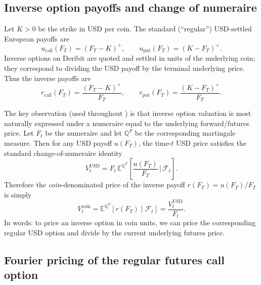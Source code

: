 \documentclass[a4paper,titlepage,12pt]{report}
\theoremstyle{plain}
\begin{document}
\subsection{Inverse option payoffs and change of numeraire}
\label{subsec:inverse_payoffs}

Let $K>0$ be the strike in USD per coin. The standard (``regular'') USD-settled European payoffs are
\begin{equation}
u_{\text{call}}(F_T) = (F_T-K)^+,\qquad
u_{\text{put}}(F_T)  = (K-F_T)^+.
\end{equation}
Inverse options on Deribit are quoted and settled in units of the underlying coin; they correspond to dividing the USD payoff by the terminal underlying price. Thus the inverse payoffs are \citep{LucicSepp2024}
\begin{equation}
r_{\text{call}}(F_T) = \frac{(F_T-K)^+}{F_T},\qquad
r_{\text{put}}(F_T)  = \frac{(K-F_T)^+}{F_T}.
\label{eq:inverse_payoffs}
\end{equation}

The key observation (used throughout \citet{LucicSepp2024}) is that inverse option valuation is most naturally expressed under a numeraire equal to the underlying forward/futures price. Let $F_t$ be the numeraire and let $\mathbb{Q}^{F}$ be the corresponding martingale measure. Then for any USD payoff $u(F_T)$, the time-$t$ USD price satisfies the standard change-of-numeraire identity \citep{GemanElKarouiRochet1995,LucicSepp2024}
\begin{equation}
V_t^{\mathrm{USD}}
=
F_t\,
\mathbb{E}^{\mathbb{Q}^{F}}\!\left[\frac{u(F_T)}{F_T}\,\bigg|\,\mathcal{F}_t\right].
\label{eq:numeraire_identity}
\end{equation}
Therefore the \emph{coin}-denominated price of the inverse payoff $r(F_T)=u(F_T)/F_T$ is simply
\begin{equation}
\boxed{
V_t^{\mathrm{coin}}
=
\mathbb{E}^{\mathbb{Q}^{F}}\!\left[r(F_T)\mid \mathcal{F}_t\right]
=
\frac{V_t^{\mathrm{USD}}}{F_t}.}
\label{eq:inverse_price_relation}
\end{equation}
In words: to price an inverse option in coin units, we can price the corresponding regular USD option and divide by the current underlying futures price.

\subsection{Fourier pricing of the regular futures call option}
\label{subsec:fft_pricing}
\end{document}
